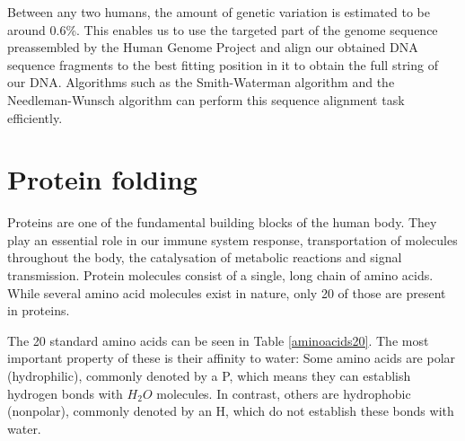 Between any two humans, the amount of genetic variation is estimated to be around 0.6\%\cite{the_1000_genomes_project_consortium_global_2015}. This enables us to use the targeted part of the genome sequence preassembled by the Human Genome Project and align our obtained DNA sequence fragments to the best fitting position in it to obtain the full string of our DNA. Algorithms such as the Smith-Waterman algorithm and the Needleman-Wunsch algorithm can perform this sequence alignment task efficiently.

\section{Protein folding}

Proteins are one of the fundamental building blocks of the human body. They play an essential role in our immune system response, transportation of molecules throughout the body, the catalysation of metabolic reactions and signal transmission. Protein molecules consist of a single, long chain of amino acids. While several amino acid molecules exist in nature, only 20 of those are present in proteins.\cite{BockenhauerAlgoBioinfo}

The 20 standard amino acids can be seen in Table \ref{aminoacids20}. The most important property of these is their affinity to water: Some amino acids are polar (hydrophilic), commonly denoted by a P, which means they can establish hydrogen bonds with $H_2O$ molecules. In contrast, others are hydrophobic (nonpolar), commonly denoted by an H, which do not establish these bonds with water.

